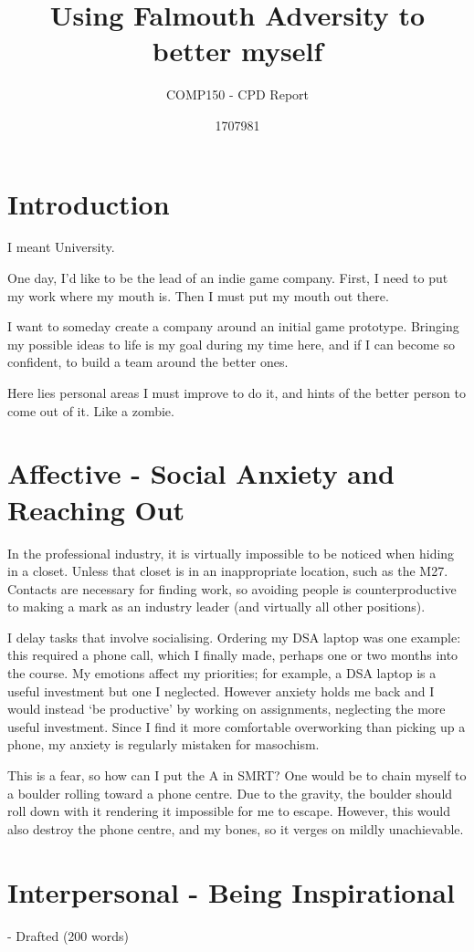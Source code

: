 \documentclass{scrartcl}
\title{Using Falmouth Adversity to better myself}
\subtitle{COMP150 - CPD Report}
\author{1707981}
\begin{document}
\maketitle

\section{Introduction}
I meant University.

One day, I'd like to be the lead of an indie game company. First, I need to put my work where my mouth is. Then I must put my mouth out there.

I want to someday create a company around an initial game prototype. Bringing my possible ideas to life is my goal during my time here, and if I can become so confident, to build a team around the better ones.

Here lies personal areas I must improve to do it, and hints of the better person to come out of it. Like a zombie.

\section{Affective - Social Anxiety and Reaching Out}
In the professional industry, it is virtually impossible to be noticed when hiding in a closet. Unless that closet is in an inappropriate location, such as the M27. Contacts are necessary for finding work, so avoiding people is counterproductive to making a mark as an industry leader (and virtually all other positions).

I delay tasks that involve socialising. Ordering my DSA laptop was one example: this required a phone call, which I finally made, perhaps one or two months into the course. My emotions affect my priorities; for example, a DSA laptop is a useful investment but one I neglected. However anxiety holds me back and I would instead `be productive' by working on assignments, neglecting the more useful investment. Since I find it more comfortable overworking than picking up a phone, my anxiety is regularly mistaken for masochism.

This is a fear, so how can I put the A in SMRT? One would be to chain myself to a boulder rolling toward a phone centre. Due to the gravity, the boulder should roll down with it rendering it impossible for me to escape. However, this would also destroy the phone centre, and my bones, so it verges on mildly unachievable.

\section{Interpersonal - Being Inspirational} - Drafted (200 words)
\end{document}
